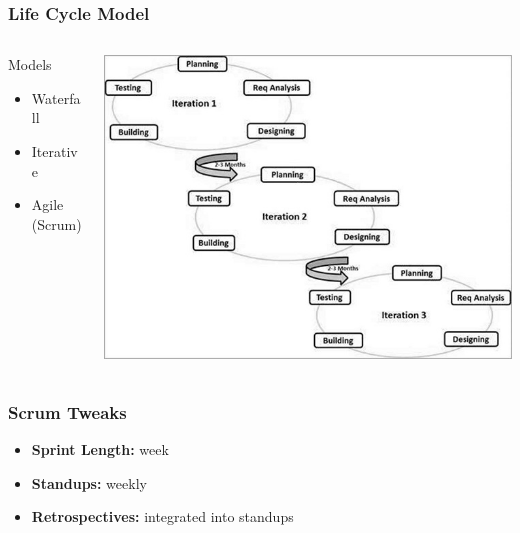 \documentclass{beamer}
\begin{document}
\begin{frame}
    \frametitle{Life Cycle Model}
    \begin{columns}
        \begin{column}{0.5\textwidth}
            \begin{block}{Models}
                \begin{itemize}
                    \item Waterfall
                    \item Iterative
                    \item Agile (Scrum)
                \end{itemize}
            \end{block}
        \end{column}
        \pause
        \begin{column}{0.5\textwidth}
            \includegraphics[scale=0.34]{../02_dev_process/res/sdlc_agile_model.jpg}
        \end{column}
    \end{columns}
\end{frame}
 
\begin{frame}
    \frametitle{Scrum Tweaks} 
    \begin{itemize}
        \item \textbf{Sprint Length:}  week \pause
        \item \textbf{Standups:} \pause weekly \pause
        \item \textbf{Retrospectives:} \pause integrated into standups \pause
    \end{itemize}
\end{frame}
\end{document}
